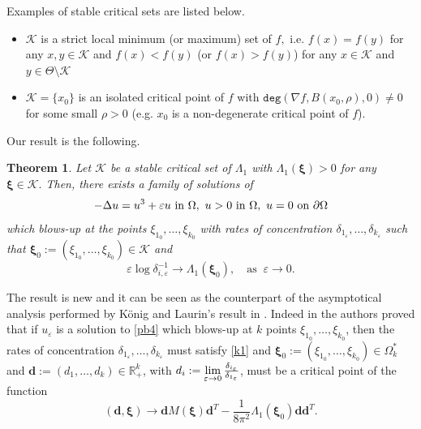 \documentclass[11pt,a4paper]{amsart}
\newcommand{\e}{\varepsilon}
\newtheorem{theorem}{Theorem}[section]
\theoremstyle{definition}
\renewcommand{\(}{\left(}
\renewcommand{\)}{\right)}
\begin{document}
Examples of stable critical sets are listed below.
\begin{itemize}
\item  $\mathscr K$ is a strict local minimum (or maximum) set of $f,$ i.e. $f(x)=f(y)$ for any $x,y\in \mathscr K$ and 
$f(x)< f(y)$ (or $f(x)> f(y)$) for any $x\in \mathscr K$ and $y\in \Theta\setminus\mathscr K$
\item $\mathscr K=\{x_0\}$ is an isolated critical point of $f$ with $\mathtt{deg}(\nabla f,B(x_0,\rho),0)\not=0$  for some small $\rho>0$ (e.g. $x_0$ is a non-degenerate critical point of $f$).
\end{itemize}
 

Our result is the following.
\begin{theorem}\label{main}
Let $\mathscr K$ be a  stable critical set of $\Lambda_1$ with $\Lambda_1(\boldsymbol\xi)>0$ for any $\boldsymbol \xi\in \mathscr K.$ Then, there exists a family of  solutions of 
\begin{equation}\label{pb4}-\Delta u=u^3+\e  u\ \hbox{in}\ \Omega, \  u>0\ \hbox{in}\ \Omega,\  u=0\ \hbox{on}\ \partial\Omega
\end{equation} which blows-up  at the points $\xi_{1_0}, \ldots, \xi_{k_0}$ with rates of concentration $\delta_{1_\e},\ldots,\delta_{k_\e}$ such that $\boldsymbol\xi_0:=(\xi_{1_0}, \ldots, \xi_{k_0})\in \mathscr K$ and
\begin{equation}\label{k1}
\e \log\delta_{i, \e}^{-1}\to \Lambda_1(\boldsymbol\xi_0),\quad\mbox{as}\,\,\ \e\to0.\end{equation}\end{theorem}    



The result is new and it can be seen as the counterpart of the asymptotical analysis performed by  K\"onig and Laurin's result in \cite{KL1}. Indeed in \cite[Theorem 1.1]
{KL1} the authors proved that if $u_\varepsilon$ is a solution to \eqref{pb4} which blows-up at $k$ points $\xi_{1_0}, \ldots, \xi_{k_0}$, then 
the rates of concentration  $\delta_{1_\e},\ldots,\delta_{k_\e}$ must satisfy \eqref{k1} and $\boldsymbol\xi_0:=\(\xi_{1_0}, \ldots, \xi_{k_0}\)\in\Omega_k^*$
and $\boldsymbol d:=\(d_1,\dots,d_k\)\in\mathbb R^k_+$, with  $d_i:=\lim\limits_{\e\to0}
 {\delta_{i_\e}\over\delta_{1_\e}} $,  must be a critical point of the function
\begin{equation}\label{k2}  (\boldsymbol d,\boldsymbol\xi)\longrightarrow \boldsymbol dM(\boldsymbol\xi)\boldsymbol d^T-\frac1{8\pi^2}\Lambda_1(\boldsymbol\xi_0)\boldsymbol d\boldsymbol d^T.\end{equation}
\end{document}
